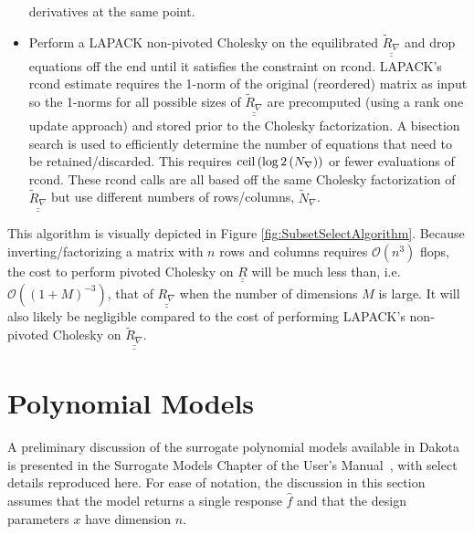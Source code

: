 \begin{itemize}
      derivatives at the same point.
\item Perform a LAPACK non-pivoted Cholesky on the equilibrated   
      $\underline{\underline{\tilde{R}_{\nabla}}}$ and drop equations off 
      the end until it satisfies the constraint on rcond.  LAPACK's rcond 
      estimate requires the 1-norm of the original (reordered) matrix as 
      input so the 1-norms for all possible sizes of 
      $\underline{\underline{\tilde{R}_{\nabla}}}$ are precomputed (using 
      a rank one update approach) and stored prior to the Cholesky 
      factorization.  A bisection search is used to efficiently determine 
      the number of equations that need to be retained/discarded. This
      requires ${\rm ceil}\left(\log2\left(N_{\nabla}\right)\right)$ or
      fewer evaluations of rcond.  These rcond calls are all based off the same
      Cholesky factorization of $\underline{\underline{\tilde{R}_{\nabla}}}$
      but use different numbers of rows/columns, $\tilde{N}_{\nabla}$.
\end{itemize}
This algorithm is visually depicted in Figure 
\ref{fig:SubsetSelectAlgorithm}.  Because inverting/factorizing a matrix 
with $n$ rows and columns requires $\mathcal{O}\left(n^3\right)$ flops, 
the cost to perform pivoted Cholesky on $\underline{\underline{R}}$ will be 
much less than, i.e. $\mathcal{O}\left((1+M)^{-3}\right)$, that of 
$\underline{\underline{R_{\nabla}}}$ when the number of dimensions $M$ 
is large.  It will also likely be negligible compared to the cost of
performing LAPACK's non-pivoted Cholesky on 
$\underline{\underline{\tilde{R}_{\nabla}}}$.

\section{Polynomial Models}\label{sec:poly_surr}

A preliminary discussion of the surrogate polynomial models available in
Dakota is presented in the Surrogate Models Chapter of the User's 
Manual~\cite{UsersMan}, with select details reproduced here. For ease of 
notation, the discussion in this section assumes that the model returns a 
single response $\hat{f}$ and that the design parameters $x$ have dimension $n$. 

